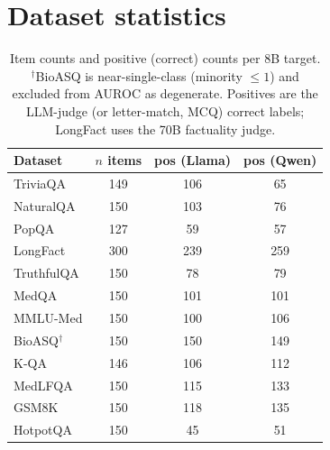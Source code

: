 \documentclass[11pt]{article}
\begin{document}
\section{Dataset statistics}\label{app:stats}
\begin{table}[h]
\centering\small
\begin{tabular}{lccc}
\toprule
Dataset & $n$ items & pos (Llama) & pos (Qwen) \\
\midrule
TriviaQA & 149 & 106 & 65 \\
NaturalQA & 150 & 103 & 76 \\
PopQA & 127 & 59 & 57 \\
LongFact & 300 & 239 & 259 \\
TruthfulQA & 150 & 78 & 79 \\
MedQA & 150 & 101 & 101 \\
MMLU-Med & 150 & 100 & 106 \\
BioASQ$^\dagger$ & 150 & 150 & 149 \\
K-QA & 146 & 106 & 112 \\
MedLFQA & 150 & 115 & 133 \\
GSM8K & 150 & 118 & 135 \\
HotpotQA & 150 & 45 & 51 \\
\bottomrule
\end{tabular}
\caption{Item counts and positive (correct) counts per 8B target. $^\dagger$BioASQ is
near-single-class (minority $\le 1$) and excluded from AUROC as degenerate. Positives are the
LLM-judge (or letter-match, MCQ) correct labels; LongFact uses the 70B factuality judge.}
\label{tab:stats}
\end{table}
\end{document}
